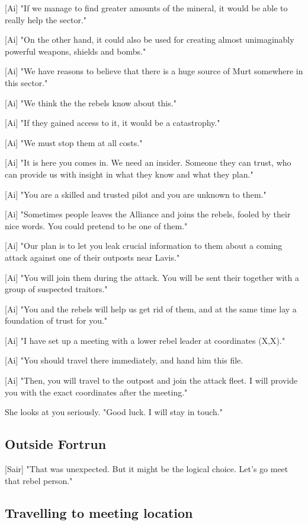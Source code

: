 \documentclass[a4paper,12pt]{article}
\begin{document}
[Ai] "If we manage to find greater amounts of the mineral, it would be able to really
help the sector."

[Ai] "On the other hand, it could also be used for creating almost unimaginably powerful weapons, shields
and bombs."

[Ai] "We have reasons to believe that there is a huge source of Murt somewhere in this sector." 

[Ai] "We think the the rebels know about this." 

[Ai] "If they gained access to it, it would be a catastrophy." 

[Ai] "We must stop them at all costs."

[Ai] "It is here you comes in. We need an insider. Someone they can trust, who can
provide us with insight in what they know and what they plan."

[Ai] "You are a skilled and trusted pilot and you are unknown to them." 

[Ai] "Sometimes people leaves the Alliance and joins the rebels, fooled by their nice words.
	You could pretend to be one of them."

[Ai] "Our plan is to let you leak crucial information to them about a coming attack against
one of their outposts near Lavis." 

[Ai] "You will join them during the attack. You will be sent their together with a group of suspected
traitors." 

[Ai] "You and the rebels will help us get rid of them, and at the same time
lay a foundation of trust for you."

[Ai] "I have set up a meeting with a lower rebel leader at coordinates (X,X)." 

[Ai] "You should travel there immediately, and hand him this file. 

[Ai] "Then, you will travel to the outpost and join the attack fleet. I will provide you with the exact coordinates
after the meeting."

She looks at you seriously. "Good luck. I will stay in touch."

\subsection{Outside Fortrun}

[Sair] "That was unexpected. But it might be the logical choice. Let's go meet that rebel person."

\subsection{Travelling to meeting location}
\end{document}
